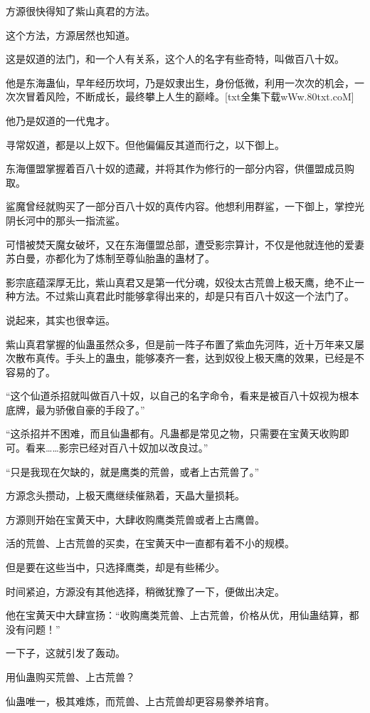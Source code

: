 \begin{this_body}
方源很快得知了紫山真君的方法。

这个方法，方源居然也知道。

这是奴道的法门，和一个人有关系，这个人的名字有些奇特，叫做百八十奴。

他是东海蛊仙，早年经历坎坷，乃是奴隶出生，身份低微，利用一次次的机会，一次次冒着风险，不断成长，最终攀上人生的巅峰。[txt全集下载wWw.80txt.coM]

他乃是奴道的一代鬼才。

寻常奴道，都是以上奴下。但他偏偏反其道而行之，以下御上。

东海僵盟掌握着百八十奴的遗藏，并将其作为修行的一部分内容，供僵盟成员购取。

鲨魔曾经就购买了一部分百八十奴的真传内容。他想利用群鲨，一下御上，掌控光阴长河中的那头一指流鲨。

可惜被焚天魔女破坏，又在东海僵盟总部，遭受影宗算计，不仅是他就连他的爱妻苏白曼，亦都化为了炼制至尊仙胎蛊的蛊材了。

影宗底蕴深厚无比，紫山真君又是第一代分魂，奴役太古荒兽上极天鹰，绝不止一种方法。不过紫山真君此时能够拿得出来的，却是只有百八十奴这一个法门了。

说起来，其实也很幸运。

紫山真君掌握的仙蛊虽然众多，但是前一阵子布置了紫血先河阵，近十万年来又屡次散布真传。手头上的蛊虫，能够凑齐一套，达到奴役上极天鹰的效果，已经是不容易的了。

“这个仙道杀招就叫做百八十奴，以自己的名字命令，看来是被百八十奴视为根本底牌，最为骄傲自豪的手段了。”

“这杀招并不困难，而且仙蛊都有。凡蛊都是常见之物，只需要在宝黄天收购即可。看来……影宗已经对百八十奴加以改良过。”

“只是我现在欠缺的，就是鹰类的荒兽，或者上古荒兽了。”

方源念头攒动，上极天鹰继续催熟着，天晶大量损耗。

方源则开始在宝黄天中，大肆收购鹰类荒兽或者上古鹰兽。

活的荒兽、上古荒兽的买卖，在宝黄天中一直都有着不小的规模。

但是要在这些当中，只选择鹰类，却是有些稀少。

时间紧迫，方源没有其他选择，稍微犹豫了一下，便做出决定。

他在宝黄天中大肆宣扬：“收购鹰类荒兽、上古荒兽，价格从优，用仙蛊结算，都没有问题！”

一下子，这就引发了轰动。

用仙蛊购买荒兽、上古荒兽？

仙蛊唯一，极其难炼，而荒兽、上古荒兽却更容易豢养培育。


\end{this_body}
